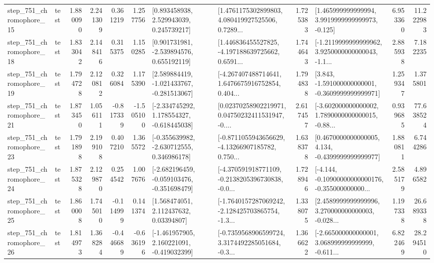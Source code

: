 \begin{tabular}{llrrrrllrlrr}
  step\_751\_chromophore\_15 &      test &      1.880090 &    2.241309 &      0.361219 &  1.257756 &     [0.893458938, 2.529943039, 0.245739217] &  [1.4761175302899803, 4.080419927525506, 0.7289... &       1.725383 &    [1.465999999999994, 3.9919999999999973, -0.125] &            6.953360 &         11.222983 \\
  step\_751\_chromophore\_18 &      test &      1.833042 &    2.148416 &      0.315375 &  1.150285 &    [0.901731981, -2.539894576, 0.655192119] &  [1.446836455527825, -4.197188639725662, 0.6591... &       1.744643 &  [-1.2119999999999962, 3.9250000000000043, -1.1... &            2.885938 &          7.182235 \\
  step\_751\_chromophore\_19 &      test &      1.794728 &    2.120812 &      0.326084 &  1.175390 &   [2.589884419, -1.021433767, -0.281513067] &  [-4.267407488714641, 1.6476675916752854, 0.404... &       1.794838 &   [3.843, -1.591000000000001, -0.3609999999999971] &            1.259347 &          1.375801 \\
  step\_751\_chromophore\_21 &      test &      1.873450 &    1.056111 &     -0.817339 & -1.505100 &   [-2.334745292, 1.178554327, -0.618445038] &  [0.02370258902219971, 0.04750232411531947, -0.... &       2.617457 &  [-3.602000000000002, 1.7890000000000015, -0.88... &            0.939685 &         77.638524 \\
  step\_751\_chromophore\_23 &      test &      1.791898 &    2.199108 &      0.407210 &  1.365572 &   [-0.355639982, -2.630712555, 0.346986178] &  [-0.8711055943656629, -4.13266907185782, 0.750... &       1.638378 &   [0.4670000000000005, 4.134, -0.4399999999999977] &            1.880811 &          6.744286 \\
  step\_751\_chromophore\_24 &      test &      1.875328 &    2.129870 &      0.254542 &  1.007676 &  [-2.682196459, -0.059103476, -0.351698479] &  [-4.370591918771109, -0.2138205396730838, -0.0... &       1.728946 &  [-4.144, -0.10900000000000176, -0.355000000000... &            2.585179 &          4.896582 \\
  step\_751\_chromophore\_25 &      test &      1.860008 &    1.745010 &     -0.114999 &  0.141374 &      [1.568474051, 2.112437632, 0.03394807] &  [-1.7640157287069242, -2.128425703865754, -1.3... &       1.338075 &  [2.4589999999999996, 3.270000000000003, -0.028... &            1.197338 &         26.689338 \\
  step\_751\_chromophore\_26 &      test &      1.814973 &    1.368284 &     -0.446689 & -0.636196 &   [-1.461957905, 2.160221091, -0.419032399] &  [-0.7359568906599724, 3.3174492285051684, -0.3... &       1.366622 &  [-2.665000000000001, 3.068999999999999, -0.611... &            6.822469 &         28.294510 \\

\end{tabular}
